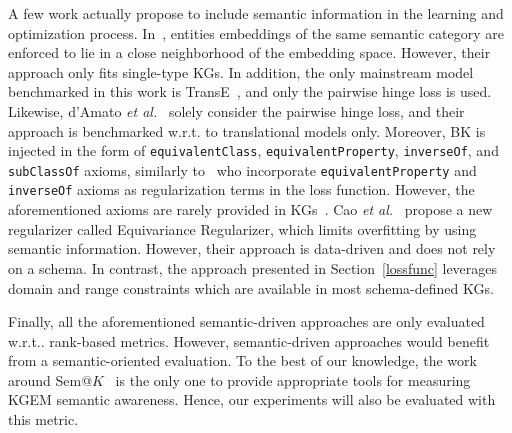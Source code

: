 \documentclass[letterpaper]{article} %
\begin{document}
A few work actually propose to include semantic information in the learning and optimization process.
In~\cite{guo2015}, entities embeddings of the same semantic category are enforced to lie in a close neighborhood of the embedding space. However, their approach only fits single-type KGs. In addition, the only mainstream model benchmarked in this work is TransE~\cite{transe}, and only the pairwise hinge loss is used. Likewise, d'Amato \textit{et al.}~\cite{damato2021} solely consider the pairwise hinge loss, and their approach is benchmarked w.r.t. to translational models only. Moreover, BK is injected in the form of \texttt{equivalentClass}, \texttt{equivalentProperty}, \texttt{inverseOf}, and \texttt{subClassOf} axioms, similarly to~\cite{minervini2017} who incorporate \texttt{equivalentProperty} and \texttt{inverseOf} axioms as regularization terms in the loss function. However, the aforementioned axioms are rarely provided in KGs~\cite{ding2018}. Cao \textit{et al.}~\cite{cao2022} propose a new regularizer called Equivariance Regularizer, which limits overfitting by using semantic information. However, their approach is data-driven and does not rely on a schema. In contrast, the approach presented in Section~\ref{lossfunc} leverages domain and range constraints which are available in most schema-defined KGs.

Finally, all the aforementioned semantic-driven approaches are only evaluated w.r.t.. rank-based metrics. However, semantic-driven approaches would benefit from a semantic-oriented evaluation. To the best of our knowledge, the work around Sem@$K$~\cite{dl4kg,ekaw,hubert2023} is the only one to provide appropriate tools for measuring KGEM semantic awareness. Hence, our experiments will also be evaluated with this metric.
\end{document}
